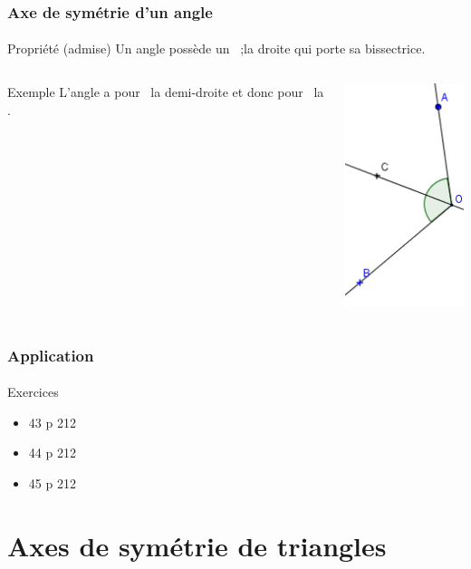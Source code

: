 \documentclass[xcolor={dvipsnames}]{beamer}
\begin{document}
\begin{frame}
\frametitle{Axe de symétrie d'un angle}  
\framesubtitle{}

\begin{alertblock}{Propriété (admise)}
	Un angle possède un \asym\ ;\pause  la droite qui porte sa bissectrice.
\end{alertblock}

\begin{columns}[c]
	
\begin{column}{7cm}
\begin{exampleblock}{Exemple}
	L'angle  a pour \bissec\ la demi-droite  et donc pour \asym\ la .
\end{exampleblock}
\end{column}

\begin{column}{3cm}
	\includegraphics[scale=0.4]{./img/angle}
\end{column}

\end{columns}
\end{frame}

\begin{frame}
	\frametitle{Application}  
	\framesubtitle{}
	
	\begin{block}{Exercices}
		\begin{itemize}
			\item 43 p 212
			\item 44 p 212
			\item 45 p 212
		\end{itemize}
	\end{block}
\end{frame}

\section{Axes de symétrie de triangles}
\end{document}
